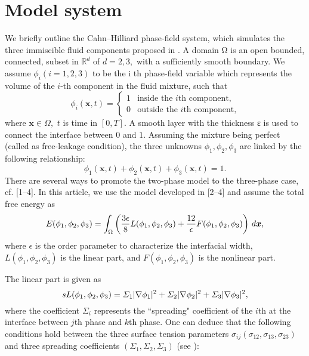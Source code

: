 \section{Model system}
\label{sec:model}
We briefly outline the Cahn–Hilliard phase-field system, which simulates the three immiscible fluid components proposed in \cite{Boyer2011esaim,Boyer2010Transp,Boyer2006M2AN}. A domain Ω is an open bounded, connected, subset in $\mathbb{R}^d$ of $d = 2,3,$ with a sufficiently smooth boundary. We assume $\phi_i(i=1,2,3)$ to be the i th phase-field variable which represents the volume of the $i$-th component in the fluid mixture, such that
\begin{equation}
	\phi_i(\bm{x},t) =\begin{cases}
		1 & \text{inside the $i$th component,} \\
	    0 & \text{outside the $i$th component,}
	\end{cases}
\end{equation}
where $\bm{x}\in\Omega,$ $t$ is time in $[0,T].$ A smooth layer with the thickness ε is used to connect the interface between $0$ and $1.$ Assuming the mixture being perfect (called as free-leakage condition), the three unknowns $\phi_1,\phi_2,\phi_3$ are linked by the following relationship:
\begin{equation}
	\label{eq:sum1}
	\phi_1(\bm{x},t) + 	\phi_2(\bm{x},t) +	\phi_3(\bm{x},t)  =1.
\end{equation}
There are several ways to promote the two-phase model to the three-phase case, cf. [1–4]. In this article, we use
the model developed in [2–4] and assume the total free energy as
\begin{equation}
\label{eq:energy0}
E(\phi_1,\phi_2,\phi_3) = \int_\Omega\left( \dfrac{3\epsilon}{8}L(\phi_1,\phi_2,\phi_3)+\dfrac{12}{\epsilon}F(\phi_1,\phi_2,\phi_3) \right)\,d{\bm x},
\end{equation}
where $\epsilon$ is the order parameter to characterize the interfacial width, $L(\phi_1,\phi_2,\phi_3)$ is the linear part, and $F(\phi_1,\phi_2,\phi_3)$ is the nonlinear part.

The linear part is given as
\begin{equation}s
L(\phi_1,\phi_2,\phi_3) = \varSigma_1\lvert\nabla \phi_1\rvert^2+\varSigma_2\lvert\nabla \phi_2\rvert^2+\varSigma_3\lvert\nabla \phi_3\rvert^2,
\end{equation}
where the coefficient $\varSigma_i$ represents the ``spreading" coefficient of the $i$th at the interface between $j$th phase and $k$th phase. One can deduce that the following conditions hold between the three surface tension parameters $\sigma_{ij}(\sigma_{12},\sigma_{13},\sigma_{23})$ and three spreading coefficients $(\varSigma_1,\varSigma_2,\varSigma_3)$  (see \cite{Boyer2011esaim,Boyer2010Transp,Boyer2006M2AN}):

